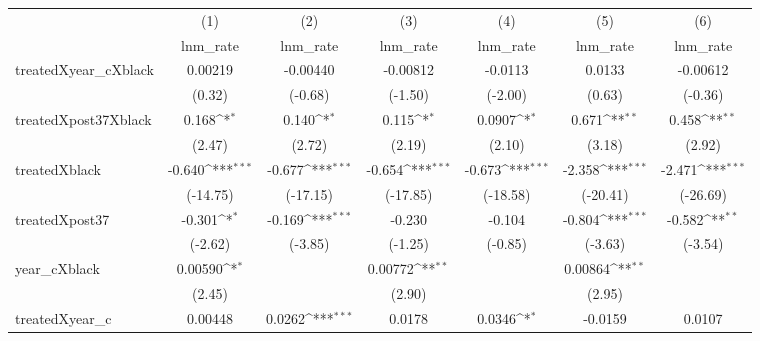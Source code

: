 {
\def\sym#1{\ifmmode^{#1}\else\(^{#1}\)\fi}
\begin{tabular}{l*{6}{c}}
\hline\hline
            &\multicolumn{1}{c}{(1)}&\multicolumn{1}{c}{(2)}&\multicolumn{1}{c}{(3)}&\multicolumn{1}{c}{(4)}&\multicolumn{1}{c}{(5)}&\multicolumn{1}{c}{(6)}\\
            &\multicolumn{1}{c}{lnm\_rate}&\multicolumn{1}{c}{lnm\_rate}&\multicolumn{1}{c}{lnm\_rate}&\multicolumn{1}{c}{lnm\_rate}&\multicolumn{1}{c}{lnm\_rate}&\multicolumn{1}{c}{lnm\_rate}\\
\hline
treatedXyear\_cXblack&     0.00219         &    -0.00440         &    -0.00812         &     -0.0113         &      0.0133         &    -0.00612         \\
            &      (0.32)         &     (-0.68)         &     (-1.50)         &     (-2.00)         &      (0.63)         &     (-0.36)         \\
[1em]
treatedXpost37Xblack&       0.168\sym{*}  &       0.140\sym{*}  &       0.115\sym{*}  &      0.0907\sym{*}  &       0.671\sym{**} &       0.458\sym{**} \\
            &      (2.47)         &      (2.72)         &      (2.19)         &      (2.10)         &      (3.18)         &      (2.92)         \\
[1em]
treatedXblack&      -0.640\sym{***}&      -0.677\sym{***}&      -0.654\sym{***}&      -0.673\sym{***}&      -2.358\sym{***}&      -2.471\sym{***}\\
            &    (-14.75)         &    (-17.15)         &    (-17.85)         &    (-18.58)         &    (-20.41)         &    (-26.69)         \\
[1em]
treatedXpost37&      -0.301\sym{*}  &      -0.169\sym{***}&      -0.230         &      -0.104         &      -0.804\sym{***}&      -0.582\sym{**} \\
            &     (-2.62)         &     (-3.85)         &     (-1.25)         &     (-0.85)         &     (-3.63)         &     (-3.54)         \\
[1em]
year\_cXblack&     0.00590\sym{*}  &                     &     0.00772\sym{**} &                     &     0.00864\sym{**} &                     \\
            &      (2.45)         &                     &      (2.90)         &                     &      (2.95)         &                     \\
[1em]
treatedXyear\_c&     0.00448         &      0.0262\sym{***}&      0.0178         &      0.0346\sym{*}  &     -0.0159         &      0.0107         \\

\end{tabular}}
